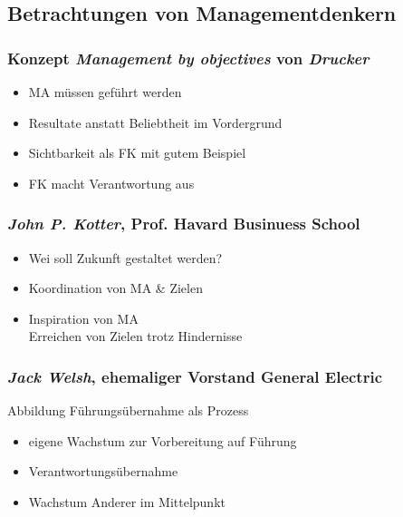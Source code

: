 \documentclass{cheatsheet}
\begin{document}
    \subsection{Betrachtungen von Managementdenkern}
    \begin{normbox}{\subsubsection{Konzept \emph{Management by objectives} von \emph{Drucker}}}
        \begin{itemize}
            \item MA müssen geführt werden
            \item Resultate anstatt Beliebtheit im Vordergrund
            \item Sichtbarkeit als FK mit gutem Beispiel
            \item FK macht Verantwortung aus
        \end{itemize}
    \end{normbox}
    \begin{normbox}{\subsubsection{\emph{John P. Kotter}, Prof. Havard Businuess School}}
        \begin{itemize}
            \item Wei soll Zukunft gestaltet werden?
            \item Koordination von MA \& Zielen
            \item Inspiration von MA\\
            \ra Erreichen von Zielen trotz Hindernisse
        \end{itemize}
    \end{normbox}
    \begin{normbox}{\subsubsection{\emph{Jack Welsh}, ehemaliger Vorstand General Electric}}
        Abbildung Führungsübernahme als Prozess
        \begin{itemize}
            \item eigene Wachstum zur Vorbereitung auf Führung
            \item Verantwortungsübernahme
            \item Wachstum Anderer im Mittelpunkt 
        \end{itemize}
    \end{normbox}
\end{document}
